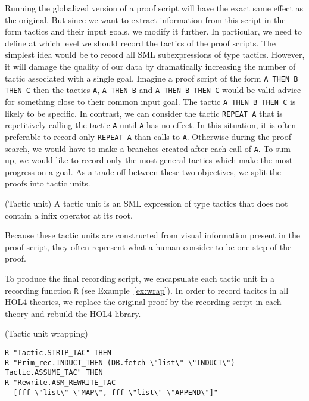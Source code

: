 \documentclass[runningheads,a4paper,draft]{svjour3}
\def\holfour{\textsf{HOL4}\xspace}
\def\sml{\textsf{SML}\xspace}
\begin{document}
Running the globalized version of a proof script will have the exact same
effect as the original. But since we want to extract information from this
script in the form tactics and their input goals, we modify it further.
In particular, we need to define at which level we should record the tactics of
the proof scripts. The simplest idea would be to record all \sml subexpressions
of type tactics. However, it will damage the quality of our data by
dramatically increasing the number of tactic associated with a single goal.
Imagine a proof script of the form \texttt{A THEN B THEN C} then the tactics
\texttt{A}, \texttt{A THEN B} and \texttt{A THEN B THEN C} would be valid
advice for something close to their common input goal. The tactic
\texttt{A THEN B THEN C} is likely to be specific. In contrast, we can consider
the tactic \texttt{REPEAT A} that is repetitively calling the tactic \texttt{A}
until
\texttt{A} has no effect. In this situation, it is often preferable to record
only \texttt{REPEAT A} than calls to \texttt{A}. Otherwise during the
proof search, we would have to make a branches created after each call of
\texttt{A}.
To sum up, we would like to record only the most general tactics which
make the most progress on a goal. As a trade-off between these two objectives,
we split the proofs into tactic units.

\begin{definition}(Tactic unit)
A tactic unit is an \sml expression of type tactics that does not contain a
infix operator at its root.
\end{definition}

Because these tactic units are constructed from visual information present in
the proof script, they often represent what a human consider to be one step of
the proof.

To produce the final recording script, we encapsulate each tactic unit
in a recording function \texttt{R} (see Example~\ref{ex:wrap}). In order to
record
tacitcs in all \holfour theories, we replace the original proof by the
recording script in each theory and rebuild the \holfour library.

\begin{example}\label{ex:wrap} (Tactic unit wrapping)
\begin{lstlisting}[language=SMLSmall]
R "Tactic.STRIP_TAC" THEN
R "Prim_rec.INDUCT_THEN (DB.fetch \"list\" \"INDUCT\") Tactic.ASSUME_TAC" THEN
R "Rewrite.ASM_REWRITE_TAC
  [fff \"list\" \"MAP\", fff \"list\" \"APPEND\"]"
\end{lstlisting}
\end{example}
\end{document}
